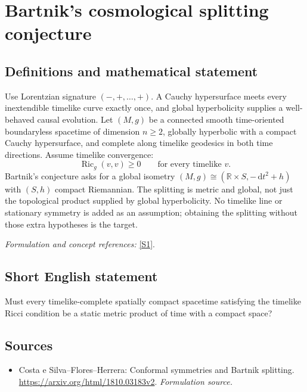 \documentclass[11pt]{article}
\begin{document}
\section*{\texorpdfstring{Bartnik's cosmological splitting conjecture}{Bartnik's cosmological splitting conjecture}}\label{30006904}
\subsection{Definitions and mathematical statement}
Use Lorentzian signature $(-,+,\ldots,+)$. A Cauchy hypersurface meets every inextendible timelike curve exactly once, and global hyperbolicity supplies a well-behaved causal evolution. Let $(M,g)$ be a connected smooth time-oriented boundaryless spacetime of dimension $n\ge2$, globally hyperbolic with a compact Cauchy hypersurface, and complete along timelike geodesics in both time directions. Assume timelike convergence:
\[
 \operatorname{Ric}_g(v,v)\ge0\qquad\text{for every timelike }v.
\]
Bartnik's conjecture asks for a global isometry $(M,g)\cong({\mathbb{R}}\times S,-{\,\mathrm{d}} t^2+h)$ with $(S,h)$ compact Riemannian. The splitting is metric and global, not just the topological product supplied by global hyperbolicity. No timelike line or stationary symmetry is added as an assumption; obtaining the splitting without those extra hypotheses is the target.
\par\smallskip\textit{Formulation and concept references:} \href{https://arxiv.org/html/1810.03183v2}{[S1]}.

\subsection{Short English statement}
Must every timelike-complete spatially compact spacetime satisfying the timelike Ricci condition be a static metric product of time with a compact space?
\subsection{Sources}
\begin{itemize}
\item[S1]Costa e Silva–Flores–Herrera: Conformal symmetries and Bartnik splitting.
\url{https://arxiv.org/html/1810.03183v2}.
\textit{Formulation source.}
\end{itemize}
\end{document}
